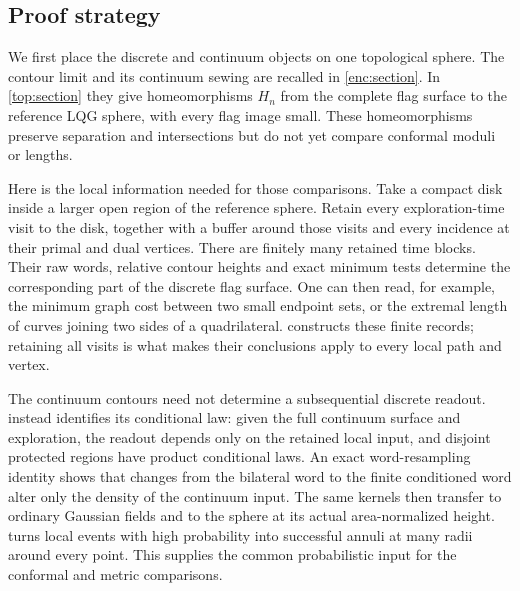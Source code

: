 \documentclass[11pt]{article}
\numberwithin{equation}{section}
\theoremstyle{definition}
\theoremstyle{remark}
\newcommand{\1}{\mathbf 1}
\begin{document}
\subsection{Proof strategy}

We first place the discrete and continuum objects on one topological
sphere. The contour limit and its continuum sewing are recalled in
\cref{enc:section}. In \cref{top:section} they give homeomorphisms
$H_n$ from the complete flag surface to the reference LQG sphere,
with every flag image small. These homeomorphisms preserve separation
and intersections but do not yet compare conformal moduli or lengths.

Here is the local information needed for those comparisons. Take a
compact disk inside a larger open region of the reference sphere.
Retain every exploration-time visit to the disk, together with a
buffer around those visits and every incidence at their primal and
dual vertices. There are finitely many retained time blocks. Their
raw words, relative contour heights and exact minimum tests determine
the corresponding part of the discrete flag surface. One can then
read, for example, the minimum graph cost between two small endpoint
sets, or the extremal length of curves joining two sides of a
quadrilateral.  constructs these finite records;
retaining all visits is what makes their conclusions apply to every
local path and vertex.

The continuum contours need not determine a subsequential discrete
readout.  instead identifies its conditional law:
given the full continuum surface and exploration, the readout depends
only on the retained local input, and disjoint protected regions have
product conditional laws. An exact word-resampling identity shows
that changes from the bilateral word to the finite conditioned word
alter only the density of the continuum input. The same kernels then
transfer to ordinary Gaussian fields and to the sphere at its actual
area-normalized height.  turns local events with
high probability into successful annuli at many radii around every
point. This supplies the common probabilistic input for the conformal
and metric comparisons.
\end{document}
